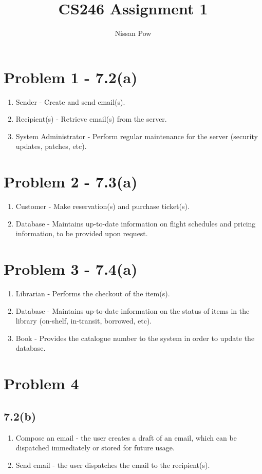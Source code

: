 \documentclass{article}[12pt]
\title{CS246 Assignment 1}
\author{Nissan Pow}
\begin{document}
\maketitle

\section*{Problem 1 - 7.2(a)}
\begin{enumerate}
  \item Sender - Create and send email(s).
  \item Recipient(s) - Retrieve email(s) from the server.
  \item System Administrator - Perform regular maintenance for the server (security updates, patches, etc).
\end{enumerate}

\section*{Problem 2 - 7.3(a)}
\begin{enumerate}
  \item Customer - Make reservation(s) and purchase ticket(s).
  \item Database - Maintains up-to-date information on flight schedules and pricing information, to be provided upon request.
\end{enumerate}

\section*{Problem 3 - 7.4(a)}
\begin{enumerate}
  \item Librarian - Performs the checkout of the item(s).
  \item Database - Maintains up-to-date information on the status of items in the library (on-shelf, in-transit, borrowed, etc).
  \item Book - Provides the catalogue number to the system in order to update the database.
\end{enumerate}

\section*{Problem 4}
  \subsection*{7.2(b)}
    \begin{enumerate}
      \item Compose an email - the user creates a draft of an email, which can be dispatched immediately or stored for future usage.
      \item Send email - the user dispatches the email to the recipient(s).
    \end{enumerate}
\end{document}
